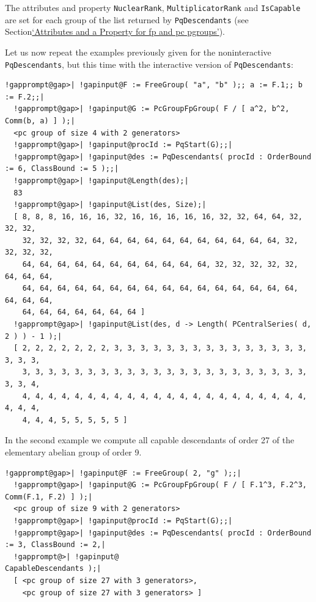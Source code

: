\documentclass[a4paper,11pt]{report}
\begin{document}
{{{ The attributes and property \texttt{NuclearRank}, \texttt{MultiplicatorRank} and \texttt{IsCapable} are set for each group of the list returned by \texttt{PqDescendants} (see Section{\nobreakspace}\hyperref[Attributes and a Property for fp and pc p-groups]{`Attributes and a Property for fp and pc p\texttt{}groups'}). 

 Let us now repeat the examples previously given for the
non\texttt{}interactive \texttt{PqDescendants}, but this time with the interactive version of \texttt{PqDescendants}: 
\begin{Verbatim}[commandchars=!@|,fontsize=\small,frame=single,label=Example]
  !gapprompt@gap>| !gapinput@F := FreeGroup( "a", "b" );; a := F.1;; b := F.2;;|
  !gapprompt@gap>| !gapinput@G := PcGroupFpGroup( F / [ a^2, b^2, Comm(b, a) ] );|
  <pc group of size 4 with 2 generators>
  !gapprompt@gap>| !gapinput@procId := PqStart(G);;|
  !gapprompt@gap>| !gapinput@des := PqDescendants( procId : OrderBound := 6, ClassBound := 5 );;|
  !gapprompt@gap>| !gapinput@Length(des);|
  83
  !gapprompt@gap>| !gapinput@List(des, Size);|
  [ 8, 8, 8, 16, 16, 16, 32, 16, 16, 16, 16, 16, 32, 32, 64, 64, 32, 32, 32, 
    32, 32, 32, 32, 64, 64, 64, 64, 64, 64, 64, 64, 64, 64, 64, 32, 32, 32, 32, 
    64, 64, 64, 64, 64, 64, 64, 64, 64, 64, 64, 32, 32, 32, 32, 32, 64, 64, 64, 
    64, 64, 64, 64, 64, 64, 64, 64, 64, 64, 64, 64, 64, 64, 64, 64, 64, 64, 64, 
    64, 64, 64, 64, 64, 64, 64 ]
  !gapprompt@gap>| !gapinput@List(des, d -> Length( PCentralSeries( d, 2 ) ) - 1 );|
  [ 2, 2, 2, 2, 2, 2, 2, 3, 3, 3, 3, 3, 3, 3, 3, 3, 3, 3, 3, 3, 3, 3, 3, 3, 3, 
    3, 3, 3, 3, 3, 3, 3, 3, 3, 3, 3, 3, 3, 3, 3, 3, 3, 3, 3, 3, 3, 3, 3, 3, 4, 
    4, 4, 4, 4, 4, 4, 4, 4, 4, 4, 4, 4, 4, 4, 4, 4, 4, 4, 4, 4, 4, 4, 4, 4, 4, 
    4, 4, 4, 5, 5, 5, 5, 5 ]
\end{Verbatim}
 In the second example we compute all capable descendants of order 27 of the
elementary abelian group of order 9. 
\begin{Verbatim}[commandchars=!@|,fontsize=\small,frame=single,label=Example]
  !gapprompt@gap>| !gapinput@F := FreeGroup( 2, "g" );;|
  !gapprompt@gap>| !gapinput@G := PcGroupFpGroup( F / [ F.1^3, F.2^3, Comm(F.1, F.2) ] );|
  <pc group of size 9 with 2 generators>
  !gapprompt@gap>| !gapinput@procId := PqStart(G);;|
  !gapprompt@gap>| !gapinput@des := PqDescendants( procId : OrderBound := 3, ClassBound := 2,|
  !gapprompt@>| !gapinput@                             CapableDescendants );|
  [ <pc group of size 27 with 3 generators>, 
    <pc group of size 27 with 3 generators> ]

\end{Verbatim}}}}
\end{document}
